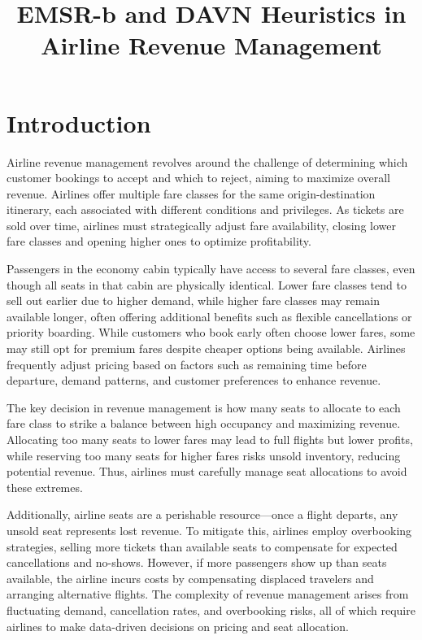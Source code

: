 \documentclass{article}
\begin{document}
\title{EMSR-b and DAVN Heuristics in Airline Revenue Management}
\author{}
\date{}
\maketitle

\section{Introduction}

Airline revenue management revolves around the challenge of determining which 
customer bookings to accept and which to reject, aiming to maximize overall 
revenue. Airlines offer multiple fare classes for the same origin-destination 
itinerary, each associated with different conditions and privileges. As tickets 
are sold over time, airlines must strategically adjust fare availability, 
closing lower fare classes and opening higher ones to optimize profitability.

Passengers in the economy cabin typically have access to several fare classes, 
even though all seats in that cabin are physically identical. Lower fare classes 
tend to sell out earlier due to higher demand, while higher fare classes may 
remain available longer, often offering additional benefits such as flexible 
cancellations or priority boarding. While customers who book early often choose 
lower fares, some may still opt for premium fares despite cheaper options being 
available. Airlines frequently adjust pricing based on factors such as remaining 
time before departure, demand patterns, and customer preferences to enhance 
revenue.

The key decision in revenue management is how many seats to allocate to each 
fare class to strike a balance between high occupancy and maximizing revenue. 
Allocating too many seats to lower fares may lead to full flights but lower 
profits, while reserving too many seats for higher fares risks unsold inventory, 
reducing potential revenue. Thus, airlines must carefully manage seat 
allocations to avoid these extremes.

Additionally, airline seats are a perishable resource—once a flight departs, any 
unsold seat represents lost revenue. To mitigate this, airlines employ 
overbooking strategies, selling more tickets than available seats to compensate 
for expected cancellations and no-shows. However, if more passengers show up 
than seats available, the airline incurs costs by compensating displaced 
travelers and arranging alternative flights. The complexity of revenue 
management arises from fluctuating demand, cancellation rates, and overbooking 
risks, all of which require airlines to make data-driven decisions on pricing 
and seat allocation.
\end{document}
